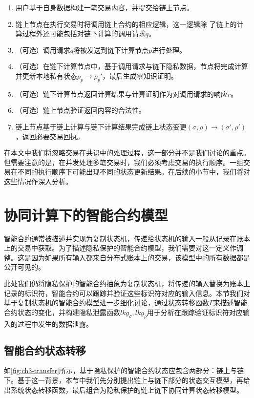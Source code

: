 \begin{enumerate}
    \setlength{\itemsep}{0pt}
    \setlength{\parsep}{0pt}
    \setlength{\parskip}{0pt}
\item 用户基于自身数据构建一笔交易内容，并提交给链上节点。
\item 链上节点在执行交易时将调用链上合约的相应逻辑，这一逻辑除 了链上的计算过程外还可能包括对链下计算的调用请求$\mathit{q}$。
\item （可选）调用请求$\mathit{q}$将被发送到链下计算节点$\mathit{p}$进行处理。
\item （可选）在链下计算节点中，基于调用请求与链下隐私数据，节点将完成计算并更新本地私有状态$\rho_\mathit{p}\rightarrow\rho_\mathit{p}'$，最后生成零知识证明。
\item （可选）链下计算节点返回计算结果与计算证明作为对调用请求的响应$\mathit{r}$。
\item （可选）链上节点验证返回内容的合法性。
\item 链上节点基于链上计算与链下计算结果完成链上状态变更$(\sigma, \rho)\rightarrow(\sigma', \rho')$，返回必要交易回执。
\end{enumerate}

在本文中我们将忽略交易在共识中的处理过程，这一部分并不是我们讨论的重点。但需要注意的是，在并发处理多笔交易时，我们必须考虑交易的执行顺序。一组交易在不同的执行顺序下可能出现不同的状态更新结果。在后续的小节中，我们将对这些情况作深入分析。
\section{协同计算下的智能合约模型}
智能合约通常被描述并实现为复制状态机，传递给状态机的输入一般从记录在账本上的交易中获取。为了描述隐私保护的智能合约模型，我们需要对这一定义作调整。这是因为如果所有输入都来自分布式账本上的交易，该模型中的所有数据都是公开可见的。

此处我们仍将隐私保护的智能合约抽象为复制状态机，将传递的输入替换为账本上记录的标识符，智能合约可以跟踪并验证这些标识符对应的输入信息。本节我们对基于复制状态机的智能合约模型进一步细化讨论，通过状态转移函数$\Gamma$来描述智能合约状态的变化，并构建隐私泄露函数$lkg_\sigma, lkg_\rho$用于分析在跟踪验证标识符对应输入的过程中发生的数据泄露。
\subsection{智能合约状态转移}
如\autoref{fig:ch3-transfer}所示，基于隐私保护的智能合约状态应包含两部分：链上与链下。基于这一背景，本节中我们先分别提出链上与链下部分的状态交互模型，再给出系统状态转移函数，最后组合为隐私保护的链上链下协同计算状态转移模型。

